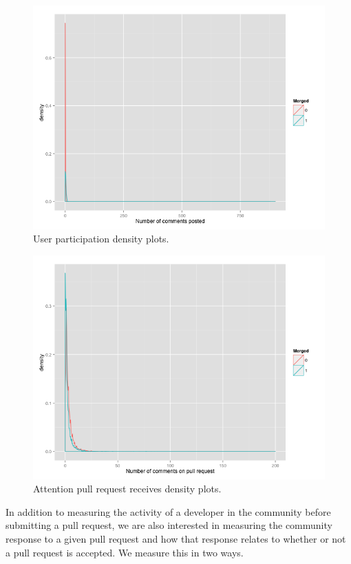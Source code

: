 \documentclass{iitthesis}
\begin{document}
\begin{figure}[p] \centering
\includegraphics[scale=0.6]{figures/number_comments_density_ggplot.png}
\caption{User participation density plots.}  \label{fig:up}
\end{figure}

\begin{figure}[p] \centering
\includegraphics[scale=0.6]{figures/comments_on_pr_density_ggplot.png}
\caption{Attention pull request receives density plots.}  \label{fig:aprr}
\end{figure}

In addition to measuring the activity of a developer in the community before
submitting a pull request, we are also interested in measuring the community
response to a given pull request and how that response relates to whether or not
a pull request is accepted. We measure this in two ways.
\end{document}
